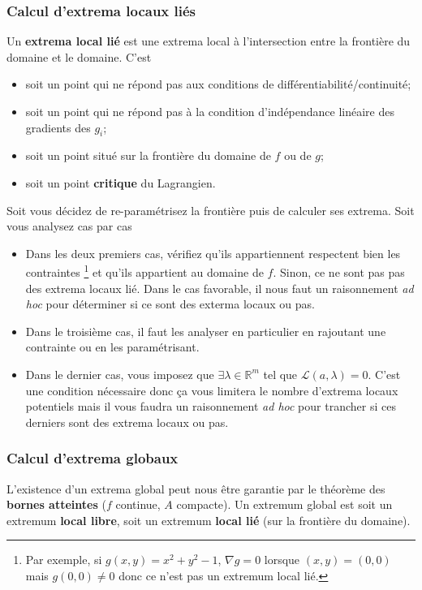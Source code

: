 \documentclass[11pt,a4paper]{article}
\theoremstyle{definition}
\newcommand{\R}{\mathbb{R}}
\begin{document}
\subsubsection{Calcul d'extrema locaux liés}
Un \textbf{extrema local lié} est une extrema local à l'intersection entre la frontière du domaine et le domaine.
C'est
\begin{itemize}
	\item soit un point qui ne répond pas aux conditions de différentiabilité/continuité;
	\item soit un point qui ne répond pas à la condition d'indépendance linéaire des gradients des $g_i$;
	\item soit un point situé sur la frontière du domaine de $f$ ou de $g$;
	\item soit un point \textbf{critique} du Lagrangien.
\end{itemize}
Soit vous décidez de re-paramétrisez la frontière puis de calculer ses extrema.
Soit vous analysez cas par cas
\begin{itemize}
	\item Dans les deux premiers cas, vérifiez qu'ils appartiennent respectent bien les contraintes
		\footnote{Par exemple, si $g(x, y) = x^2 + y^2 - 1$, $\nabla g = 0$ lorsque $(x, y) = (0, 0)$ mais $g(0, 0) \neq 0$ donc ce n'est pas un extremum local lié.}
		et qu'ils appartient au domaine de $f$.
		Sinon, ce ne sont pas pas des extrema locaux lié.
		Dans le cas favorable, il nous faut un raisonnement \emph{ad hoc} pour déterminer si ce sont des exterma locaux ou pas.
	\item Dans le troisième cas, il faut les analyser en particulier en rajoutant une contrainte ou en les paramétrisant.
	\item Dans le dernier cas, vous imposez que $\exists \lambda \in \R^m$ tel que $\mathcal{L}(a, \lambda) = 0$.
		C'est une condition nécessaire donc ça vous limitera le nombre d'extrema locaux potentiels mais il vous faudra un raisonnement \emph{ad hoc} pour trancher si ces derniers sont des extrema locaux ou pas.
\end{itemize}

\subsubsection{Calcul d'extrema globaux}
L'existence d'un extrema global peut nous être garantie par le théorème des \textbf{bornes atteintes} ($f$ continue, $A$ compacte).
Un extremum global est soit un extremum \textbf{local libre}, soit un extremum \textbf{local lié} (sur la frontière du domaine).
\end{document}
